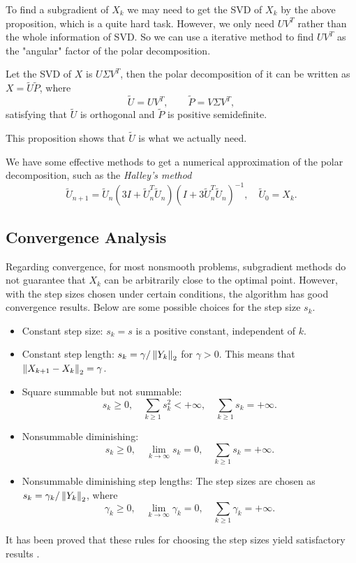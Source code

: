 \documentclass[11pt]{article}
\begin{document}
To find a subgradient of \(X_k\) we may need to get the SVD of \(X_k\) by the above proposition, which is a quite hard task. However, we only need \(UV^T\) rather than the whole information of SVD. So we can use a iterative method to find \(UV^T\) as the "angular" factor of the polar decomposition.

\begin{proposition}
    Let the SVD of \(X\) is \(U\Sigma V^T\), then the polar decomposition of it can be written as \(X=\tilde{U} \tilde{P}\), where
    \[\tilde{U}=U V^T,\qquad \tilde{P}=V\Sigma V^T,\]
    satisfying that \(\tilde{U}\) is orthogonal and \(\tilde{P}\) is positive semidefinite.
\end{proposition}

This proposition shows that \(\tilde{U}\) is what we actually need.

We have some effective methods to get a numerical approximation of the polar decomposition, such as the \emph{Halley's method}\cite{nakatsukasa2010optimizing}
\[\tilde{U}_{n+1} = \tilde{U}_{n}\left(3 I+\tilde{U}_{n}^{T} \tilde{U}_{n}\right)\left(I+3 \tilde{U}_{n}^{T} \tilde{U}_{n}\right)^{-1}, \quad \tilde{U}_{0}=X_k.\]

\subsection{Convergence Analysis}

Regarding convergence, for most nonsmooth problems, subgradient methods do not guarantee that \(X_k\) can be arbitrarily close to the optimal point. However, with the step sizes chosen under certain conditions, the algorithm has good convergence results. Below are some possible choices for the step size \(s_k\).
\begin{itemize}
    \item Constant step size: \(s_k=s\) is a positive constant, independent of \(k\).
    \item Constant step length: \(s_k=\gamma/\left\|Y_k\right\|_2\) for \(\gamma>0\). This means that \(\left\|X_{k+1}-X_k\right\|_2=\gamma\).
    \item Square summable but not summable:
    \[s_k\geqslant 0,\quad\sum_{k\geqslant 1}s_k^2<+\infty,\quad\sum_{k\geqslant 1}s_k=+\infty.\]
    \item Nonsummable diminishing:
    \[s_k\geqslant 0,\quad\lim_{k\to\infty}s_k=0,\quad\sum_{k\geqslant 1}s_k=+\infty.\]
    \item Nonsummable diminishing step lengths: The step sizes are chosen as \(s_k=\gamma_k/\left\|Y_k\right\|_2\), where
    \[\gamma_k\geqslant 0,\quad \lim_{k\to\infty}\gamma_k=0,\quad\sum_{k\geqslant 1}\gamma_k=+\infty.\]
\end{itemize}
It has been proved that these rules for choosing the step sizes yield satisfactory results \cite{boyd2003subgradient}.
\end{document}

